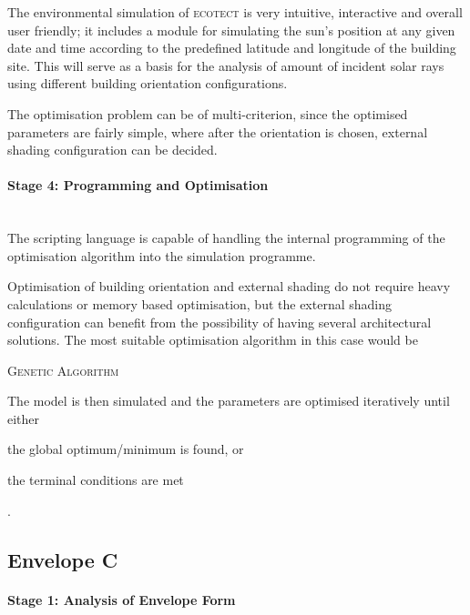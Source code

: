 The environmental simulation of \textsc{ecotect} is very intuitive, interactive and overall user friendly; it includes a module for simulating the sun's position at any given date and time according to the predefined latitude and longitude of the building site. This will serve as a basis for the analysis of amount of incident solar rays using different building orientation configurations.

The optimisation problem can be of multi-criterion, since the optimised parameters are fairly simple, where after the orientation is chosen, external shading configuration can be decided.

\paragraph{Stage 4: Programming and Optimisation}\mbox{}\\

The scripting language is capable of handling the internal programming of the optimisation algorithm into the simulation programme.

Optimisation of building orientation and external shading do not require heavy calculations or memory based optimisation, but the external shading configuration can benefit from the possibility of having several architectural solutions. The most suitable optimisation algorithm in this case would be 

\begin{compactenum}
\item \textsc{Genetic Algorithm}
\end{compactenum}

The model is then simulated and the parameters are optimised iteratively until either \begin{inparaenum}[a)]\item the global optimum/minimum is found, or \item the terminal conditions are met\end{inparaenum}.

\clearpage
\subsection{Envelope C}

\paragraph{Stage 1: Analysis of Envelope Form}\mbox{}\\[2mm]

